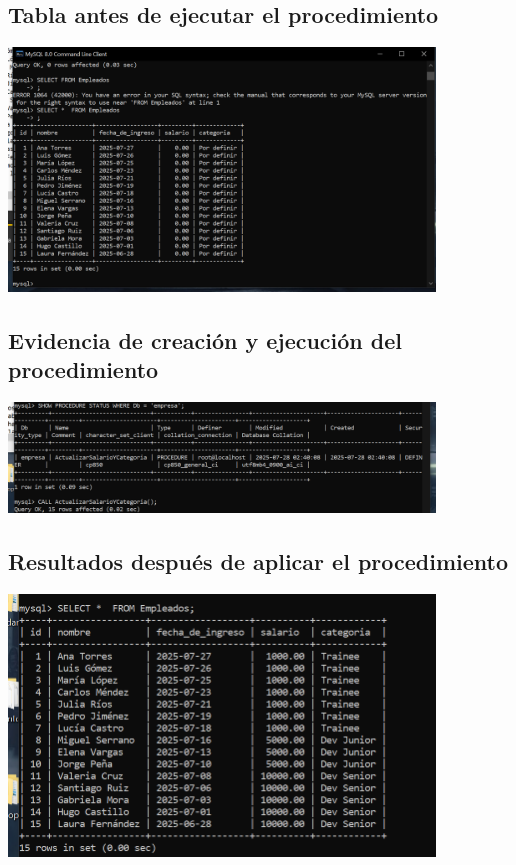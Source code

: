 \documentclass[12pt]{article}
\begin{document}
\subsection*{Tabla antes de ejecutar el procedimiento}
\begin{center}
  \includegraphics[width=0.85\textwidth]{EmpleadosInicial.png}
\end{center}

\subsection*{Evidencia de creación y ejecución del procedimiento}
\begin{center}
  \includegraphics[width=0.85\textwidth]{StoreProcedure.png}
\end{center}

\subsection*{Resultados después de aplicar el procedimiento}
\begin{center}
  \includegraphics[width=0.85\textwidth]{EmpleadosPrueba.png}
\end{center}
\end{document}
